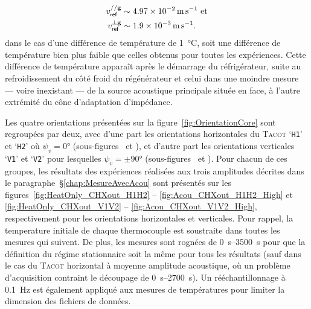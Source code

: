 \begin{subequations}
	\begin{align}
		v_{\sf ref}^{// \mathbf g} &\sim \qty{4.97e-2}{\meter\per\second} \text{ et}	\label{eq:VitesseReferenceV_Rayleigh_Exple1K}\\
		v_{\sf ref}^{\perp \mathbf g} &\sim \qty{1.9e-3}{\meter\per\second}.	\label{eq:VitesseReferenceH_Rayleigh_Exple1K}
	\end{align}
	\label{eq:VitesseReference_Rayleigh_Exple5K}%
\end{subequations}
dans le cas d'une différence de température de \qty{1}{\degreeCelsius}, soit une différence de température bien plus faible que celles obtenus pour toutes les expériences. Cette différence de température apparaît après le démarrage du réfrigérateur, suite au refroidissement du côté froid du régénérateur et celui dans une moindre mesure --- voire inexistant --- de la source acoustique principale située en face, à l'autre extrémité du cône d'adaptation d'impédance.

Les quatre orientations présentées sur la figure~\ref{fig:OrientationCore} sont regroupées par deux, avec d'une part les orientations horizontales du \textsc{Tacot} `\texttt{H1}' et `\texttt{H2}' où $\psi_v=\ang{0}$ (sous-figures~ et ), et d'autre part les orientations verticales `\texttt{V1}' et `\texttt{V2}' pour lesquelles $\psi_v=\pm\ang{90}$ (sous-figures~ et ). Pour chacun de ces groupes, les résultats des expériences réalisées aux trois amplitudes décrites dans le paragraphe~§\ref{chap:MesureAvecAcou} sont présentés sur les figures~\ref{fig:HeatOnly_CHXout_H1H2} -- \ref{fig:Acou_CHXout_H1H2_High} et \ref{fig:HeatOnly_CHXout_V1V2} -- \ref{fig:Acou_CHXout_V1V2_High}, respectivement pour les orientations horizontales et verticales. Pour rappel, la temperature initiale de chaque thermocouple est soustraite dans toutes les mesures qui suivent. De plus, les mesures sont rognées de \qtyrange{0}{3500}{\second} pour que la définition du régime stationnaire soit la même pour tous les résultats (sauf dans le cas du \textsc{Tacot} horizontal à moyenne amplitude acoustique, où un problème d'acquisition contraint le découpage de \qtyrange{0}{2700}{\second}). Un rééchantillonnage à \qty{.1}{\hertz} est également appliqué aux mesures de températures pour limiter la dimension des fichiers de données.

